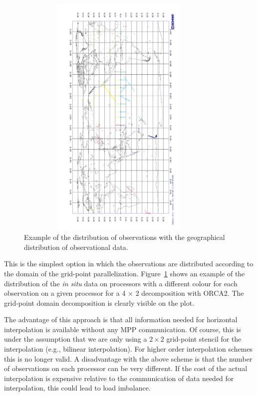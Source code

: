 \begin{figure}      \begin{center}
\includegraphics[width=10cm,height=12cm,angle=-90.]{./TexFiles/Figures/Fig_ASM_obsdist_local}
\caption{      \label{fig:obslocal}
Example of the distribution of observations with the geographical distribution of observational data.} 
\end{center}      \end{figure}

This is the simplest option in which the observations are distributed according 
to the domain of the grid-point parallelization. Figure~\ref{fig:obslocal}
shows an example of the distribution of the {\em in situ} data on processors 
with a different colour for each observation
on a given processor for a 4 $\times$ 2 decomposition with ORCA2. 
The grid-point domain decomposition is clearly visible on the plot.

The advantage of this approach is that all
information needed for horizontal interpolation is available without
any MPP communication. Of course, this is under the assumption that 
we are only using a $2 \times 2$ grid-point stencil for the interpolation 
(e.g., bilinear interpolation). For higher order interpolation schemes this
is no longer valid. A disadvantage with the above scheme is that the number of
observations on each processor can be very different. If the cost of
the actual interpolation is expensive relative to the communication of
data needed for interpolation, this could lead to load imbalance.

